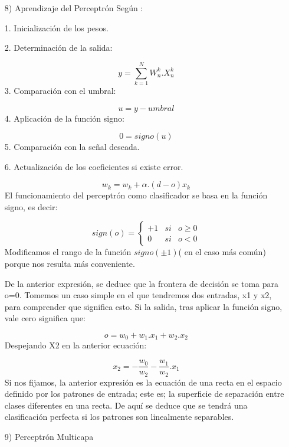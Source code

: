 \documentclass[a4paper, 12pt]{article}
\begin{document}
\begin{enumerate}
\item[8)] Aprendizaje del Perceptrón
\vskip 0.3cm
Según \cite{serrano} :\par
1.	Inicialización de los pesos.\par
2.	Determinación de la salida:\par
$$y= \sum_{k=1}^N W_n^k.X_n^k$$
3.	Comparación con el umbral:\par
$$u=y-umbral$$
4.	Aplicación de la función signo: \par
$$0=signo(u)$$
5.	Comparación con la señal deseada.\par
6.	Actualización de los coeficientes si existe error.\par
$$w_k = w_k + \alpha.(d-o)x_k$$
El funcionamiento del perceptrón como clasificador se basa en la función signo, es decir:\par
$$sign(o)=\left\{\begin{matrix}
+1 &si  & o\geq 0\\ 
 0& si & o<0
\end{matrix}\right.
$$
Modificamos el rango de la función $signo(\pm 1)$( en el caso más común) porque nos resulta más conveniente.\par
De la anterior expresión, se deduce que la frontera de decisión se toma para o=0. Tomemos un caso simple en el que tendremos dos entradas, x1 y x2, para comprender que significa esto. Si la salida, tras aplicar la función signo, vale cero significa que:\par
$$o=w_0+w_1.x_1+w_2.x_2$$
Despejando X2 en la anterior ecuación:\par
$$x_2=-\frac{w_0}{w_2}-\frac{w_1}{w_2}.x_1$$
Si nos fijamos, la anterior expresión es la ecuación de una recta en el espacio definido por los patrones de entrada; este es; la superficie de separación entre clases diferentes en una recta. De aquí se deduce que se tendrá una clasificación perfecta si los patrones son linealmente separables.\par

\vskip 0.3cm

\item[9)] Perceptrón Multicapa
\vskip 0.3cm


\end{enumerate}
\end{document}
